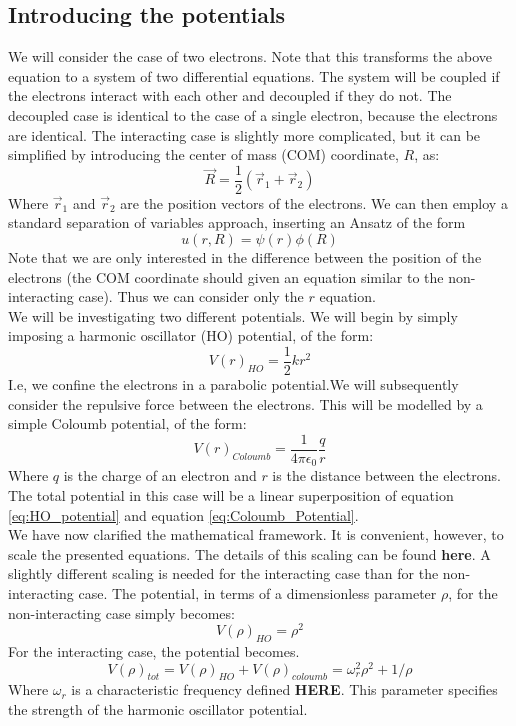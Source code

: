 \documentclass[a4paper, 10pt]{article}
\begin{document}
\subsection{Introducing the potentials}
We will consider the case of two electrons. Note that this transforms the above equation to a system of two differential equations. The system will be coupled if the electrons interact with each other and decoupled if they do not. The decoupled case is identical to the case of a single electron, because the electrons are identical. The interacting case is slightly more complicated, but it  can be simplified by introducing the center of mass (COM) coordinate, $R$, as:
$$\vec{R}=\frac{1}{2}\left(\vec{r}_1+\vec{r}_2\right)$$
Where $\vec{r}_1$ and $\vec{r}_2$ are the position vectors of the electrons. We can then employ a standard separation of variables approach, inserting an Ansatz of the form 
$$u(r,R)=\psi(r)\phi(R)$$
Note that we are only interested in the difference between the position of the electrons (the COM coordinate should given an equation similar to the non-interacting case). Thus we can consider only the $r$ equation.\\
\linebreak
We will be investigating two different potentials. We will begin by simply imposing a harmonic oscillator (HO) potential, of the form:
\begin{equation}\label{eq:HO_potential}
V(r)_{HO}=\frac{1}{2}kr^2
\end{equation}
I.e, we confine the electrons in a parabolic potential.We will subsequently consider the repulsive force between the electrons. This will be modelled by a simple Coloumb potential, of the form:
\begin{equation}\label{eq:Coloumb_Potential}
V(r)_{Coloumb}=\frac{1}{4\pi \epsilon_0}\frac{q}{r}
\end{equation}
Where $q$ is the charge of an electron and $r$ is the distance between the electrons. The total potential in this case will be a linear superposition of equation \ref{eq:HO_potential} and equation \ref{eq:Coloumb_Potential}.\\
\linebreak
We have now clarified the mathematical framework. It is convenient, however, to scale the presented equations. The details of this scaling can be found \textbf{here}. A slightly different scaling is needed for the interacting case than for the non-interacting case. The potential, in terms of a dimensionless parameter $\rho$, for the non-interacting case simply becomes:
$$V(\rho)_{HO}=\rho^2$$
For the interacting case, the potential becomes.
$$V(\rho)_{tot}=V(\rho)_{HO}+V(\rho)_{coloumb}=\omega_r^2\rho^2+1/\rho$$
Where $\omega_r$ is a characteristic frequency defined \textbf{HERE}. This parameter specifies the strength of the harmonic oscillator potential.
\end{document}
